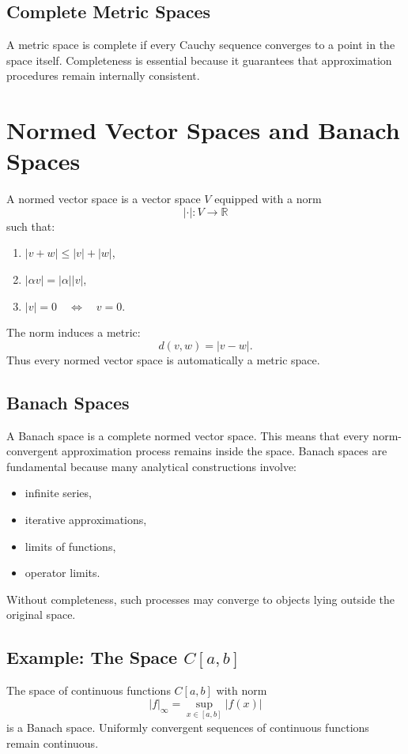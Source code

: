 \documentclass[aps,prl,twocolumn,groupedaddress]{revtex4-2}
\begin{document}
\subsection{Complete Metric Spaces}
A metric space is complete if every Cauchy sequence converges to a point in the space itself. Completeness is essential because it guarantees that approximation procedures remain internally consistent.



\section{Normed Vector Spaces and Banach Spaces}

A normed vector space is a vector space $V$ equipped with a norm 
$$
|\cdot| : V \rightarrow \mathbb{R}
$$
such that:
\begin{enumerate}
\item $|v+w| \le |v| + |w|$,
\item $|\alpha v| = |\alpha| |v|$,
\item $|v| = 0 \quad \iff \quad v = 0$.
\end{enumerate}

The norm induces a metric:
\[
d(v,w) = |v-w|.
\]
Thus every normed vector space is automatically a metric space.

\subsection{Banach Spaces}
A Banach space is a complete normed vector space. This means that every norm-convergent approximation process remains inside the space. Banach spaces are fundamental because many analytical constructions involve:
\begin{itemize}
\item infinite series,
\item iterative approximations,
\item limits of functions,
\item operator limits.
\end{itemize}
Without completeness, such processes may converge to objects lying outside the original space.

\subsection{Example: The Space $C[a,b]$}
The space of continuous functions $C[a,b]$ with norm 
\[
|f|_\infty = \sup_{x \in [a,b]} |f(x)|
\]
is a Banach space. Uniformly convergent sequences of continuous functions remain continuous.
\end{document}
